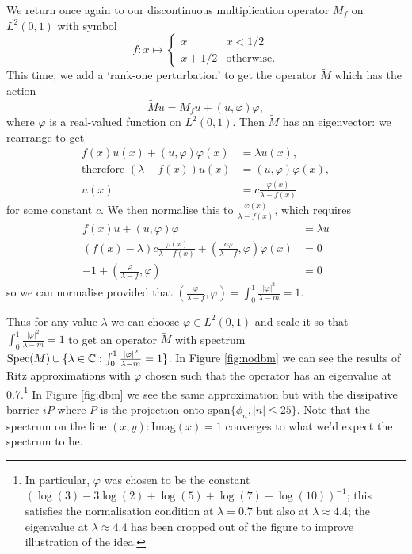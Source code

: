\documentclass[../main.tex]{subfiles}
\begin{document}
\begin{example}
We return once again to our discontinuous multiplication operator $M_f$ on $L^2(0, 1)$ with symbol
$$
f: x \mapsto \begin{cases}
x & x < 1/2\\
x+1/2 & \text{otherwise}.
\end{cases}
$$
This time, we add a `rank-one perturbation' to get the operator $\tilde{M}$ which has the action
$$\tilde{M}u = M_fu + (u, \varphi) \varphi,$$
where $\varphi$ is a real-valued function on $L^2(0, 1)$. Then $\tilde{M}$ has an eigenvector: we rearrange to get
\begin{align*}
f(x)u(x) + (u, \varphi)\varphi(x) & = \lambda u(x),\\
\text{therefore }(\lambda - f(x))u(x) & = (u, \varphi)\varphi(x),\\
u(x) & = c \frac{\varphi(x)}{\lambda - f(x)}
\end{align*}
for some constant $c$. We then normalise this to $\frac{\varphi(x)}{\lambda - f(x)}$, which requires
\begin{align*}
f(x)u + (u, \varphi)\varphi & = \lambda u \\
(f(x) - \lambda)c\frac{\varphi(x)}{\lambda - f(x)} + (\frac{c\varphi}{\lambda - f}, \varphi)\varphi(x) & = 0 \\
-1 + (\frac{\varphi}{\lambda - f}, \varphi) & = 0
\end{align*}
so we can normalise provided that $(\frac{\varphi}{\lambda - f}, \varphi) = \int_0^1 \frac{|\varphi|^2}{\lambda - m} = 1.$
\end{example}

Thus for any value $\lambda$ we can choose $\varphi \in L^2(0, 1)$ and scale it so that $\int_0^1 \frac{|\varphi|^2}{\lambda - m} = 1$
to get an operator $\tilde{M}$ with spectrum $\mathrm{Spec}(M) \cup \{\lambda \in \mathbb{C} : \int_0^1 \frac{|\varphi|^2}{\lambda - m} = 1\}$. In Figure \ref{fig:nodbm} we can see the results of Ritz approximations
with $\varphi$ chosen such that the operator has an eigenvalue at 0.7.\footnote{In particular, $\varphi$ was chosen to be the constant
$(\log(3) - 3\log(2) + \log(5) + \log(7) - \log(10))^{-1}$; this satisfies the normalisation condition at $\lambda = 0.7$ but also at $\lambda \approx 4.4$;
the eigenvalue at $\lambda \approx 4.4$ has been cropped out of the figure to improve illustration of the idea.} In Figure \ref{fig:dbm} we see the same approximation but with the dissipative barrier $iP$ where $P$ is the projection onto $\mathrm{span}\{\phi_n, |n| \leq 25\}$. Note that the spectrum on the line ${(x, y) : \mathrm{Imag}(x) = 1}$ converges to what we'd expect the spectrum to be.
\end{document}
